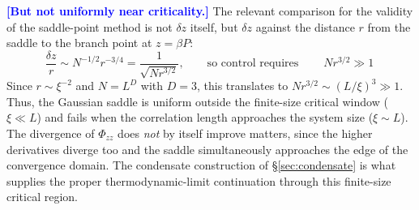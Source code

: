 \documentclass[11pt,a4paper]{article}
\newcommand{\FLAG}[1]{\textcolor{blue}{\textbf{[#1]}}}
\newcommand{\FLAG}[1]{\textcolor{blue}{\textbf{[#1]}}}
\begin{document}
\FLAG{But not uniformly near criticality.} The relevant comparison for the validity of the saddle-point method is not $\delta z$ itself, but $\delta z$ against the distance $r$ from the saddle to the branch point at $z=\beta P$:
\begin{equation}
  \frac{\delta z}{r}\sim N^{-1/2}r^{-3/4}=\frac{1}{\sqrt{N r^{3/2}}},
  \qquad\text{so control requires}\qquad
  \boxed{\ N r^{3/2}\gg1\ }
\end{equation}
Since $r\sim\xi^{-2}$ and $N=L^D$ with $D=3$, this translates to $Nr^{3/2}\sim(L/\xi)^3\gg1$. Thus, the Gaussian saddle is uniform outside the finite-size critical window ($\xi\ll L$) and fails when the correlation length approaches the system size ($\xi\sim L$). The divergence of $\Phi_{zz}$ does \emph{not} by itself improve matters, since the higher derivatives diverge too and the saddle simultaneously approaches the edge of the convergence domain. The condensate construction of \S\ref{sec:condensate} is what supplies the proper thermodynamic-limit continuation through this finite-size critical region.
\end{document}
